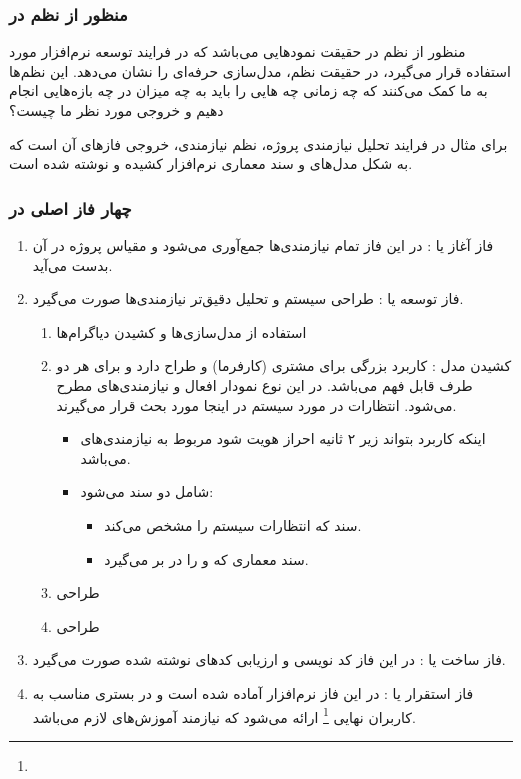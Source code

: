 \subsubsection{منظور از نظم در }

منظور از نظم در حقیقت نمود‌هایی می‌باشد که در فرایند توسعه نرم‌افزار مورد
استفاده قرار می‌گیرد، در حقیقت نظم، مدل‌سازی حرفه‌ای را نشان می‌دهد. این نظم‌ها
به ما کمک می‌کنند که چه زمانی چه هایی را باید به چه میزان در چه
بازه‌هایی انجام دهیم و خروجی مورد نظر ما چیست؟

برای مثال در فرایند تحلیل نیازمندی پروژه، نظم نیازمندی، خروجی فاز‌های آن است که
به شکل مدل‌های  و سند معماری نرم‌افزار کشیده و نوشته شده
است.

\subsubsection{چهار فاز اصلی در }

\begin{enumerate}
    \item فاز آغاز یا : در این فاز تمام نیازمندی‌ها جمع‌آوری
    می‌شود و مقیاس پروژه در آن بدست می‌آید.
    \item فاز توسعه یا : طراحی سیستم و تحلیل دقیق‌تر نیازمندی‌ها
    صورت می‌گیرد.
    \begin{enumerate}
        \item استفاده از مدل‌سازی‌ها و کشیدن دیاگرام‌ها
        \item کشیدن مدل : کاربرد بزرگی برای مشتری (کارفرما) و طراح
        دارد و برای هر دو طرف قابل فهم می‌باشد. در این نوع نمودار افعال و
        نیازمندی‌های  مطرح می‌شود. انتظارات در مورد سیستم در
        اینجا مورد بحث قرار می‌گیرند.
        \begin{itemize}
            \item اینکه کاربرد بتواند زیر ۲ ثانیه احراز هویت شود مربوط به
            نیازمندی‌های  می‌باشد.
            \item شامل دو سند می‌شود:
            \begin{itemize}
                \item سند  که انتظارات سیستم را مشخص می‌کند.
                \item سند معماری که  و  را در بر
                می‌گیرد.
            \end{itemize}
        \end{itemize}
        \item طراحی  
        \item طراحی 
    \end{enumerate}
    \item فاز ساخت یا : در این فاز کد نویسی و ارزیابی کد‌های
    نوشته شده صورت می‌گیرد.
    \item فاز استقرار یا : در این فاز نرم‌افزار آماده شده است و
    در بستری مناسب به کاربران نهایی \footnote{} ارائه می‌شود که
    نیازمند آموزش‌های لازم می‌باشد.
\end{enumerate}

